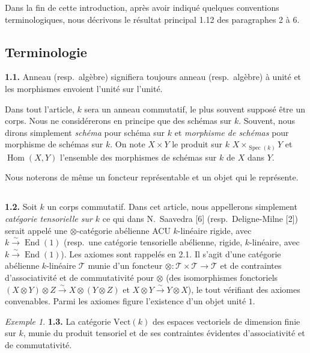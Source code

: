 \documentclass[12pt,a4paper]{article}
\theoremstyle{plain}
\theoremstyle{definition}
\theoremstyle{remark}
\newtheorem{example}[theorem]{Exemple}
\DeclareMathOperator{\Hom}{Hom}
\DeclareMathOperator{\End}{End}
\DeclareMathOperator{\Spec}{Spec}
\begin{document}
Dans la fin de cette introduction, après avoir indiqué quelques conventions terminologiques, nous décrivons le résultat principal 1.12 des paragraphes 2 à 6.

\subsection{Terminologie}

\textbf{1.1.} Anneau (resp.~algèbre) signifiera toujours anneau (resp.~algèbre) à unité et les morphismes envoient l'unité sur l'unité.

Dans tout l'article, $k$ sera un anneau commutatif, le plus souvent supposé être un corps. Nous ne considérerons en principe que des schémas sur $k$. Souvent, nous dirons simplement \emph{schéma} pour schéma sur $k$ et \emph{morphisme de schémas} pour morphisme de schémas sur $k$. On note $X \times Y$ le produit sur $k$ $X \times_{\Spec(k)} Y$ et $\Hom(X,Y)$ l'ensemble des morphismes de schémas sur $k$ de $X$ dans $Y$.

Nous noterons de même un foncteur représentable et un objet qui le représente.

\subsection{}

\textbf{1.2.} Soit $k$ un corps commutatif. Dans cet article, nous appellerons simplement \emph{catégorie tensorielle sur $k$} ce qui dans N.~Saavedra [6] (resp.~Deligne-Milne [2]) serait appelé une $\otimes$-catégorie abélienne ACU $k$-linéaire rigide, avec $k \xrightarrow{\sim} \End(1)$ (resp.~une catégorie tensorielle abélienne, rigide, $k$-linéaire, avec $k \xrightarrow{\sim} \End(1)$). Les axiomes sont rappelés en 2.1. Il s'agit d'une catégorie abélienne $k$-linéaire $\mathcal{T}$ munie d'un foncteur $\otimes : \mathcal{T} \times \mathcal{T} \to \mathcal{T}$ et de contraintes d'associativité et de commutativité pour $\otimes$ (des isomorphismes fonctoriels $(X \otimes Y) \otimes Z \xrightarrow{\sim} X \otimes (Y \otimes Z)$ et $X \otimes Y \xrightarrow{\sim} Y \otimes X$), le tout vérifiant des axiomes convenables. Parmi les axiomes figure l'existence d'un objet unité $1$.

\begin{example}
\textbf{1.3.} La catégorie $\mathrm{Vect}(k)$ des espaces vectoriels de dimension finie sur $k$, munie du produit tensoriel et de ses contraintes évidentes d'associativité et de commutativité.
\end{example}
\end{document}
